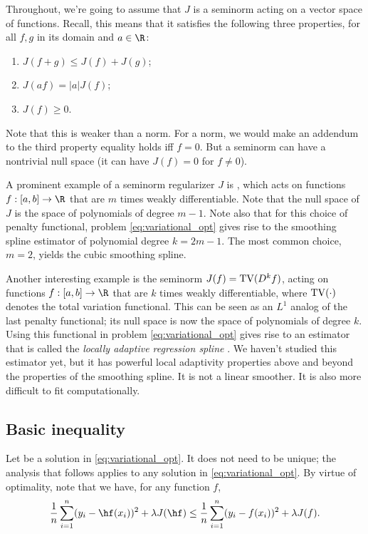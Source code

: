 \documentclass{article}
\begin{document}
Throughout, we're going to assume that $J$ is a seminorm acting on a vector
space of functions. Recall, this means that it satisfies the following three
properties, for all $f,g$ in its domain and $a \in \R$: 
\begin{enumerate}
\item $J(f+g) \leq J(f) + J(g)$;
\item $J(af) = |a| J(f)$;
\item $J(f) \geq 0$.
\end{enumerate}
Note that this is weaker than a norm. For a norm, we would make an addendum to
the third property equality holds iff $f=0$. But a seminorm can have a
nontrivial null space (it can have $J(f) = 0$ for $f \not= 0$).   

A prominent example of a seminorm regularizer $J$ is , which acts on functions $f: [a,b] \to \R$ that are $m$
times weakly differentiable. Note that the null space of $J$ is the space of
polynomials of degree $m-1$. Note also that for this choice of penalty
functional, problem \eqref{eq:variational_opt} gives rise to the smoothing
spline estimator of polynomial degree $k=2m-1$. The most common choice, $m=2$,
yields the cubic smoothing spline.   

Another interesting example is the seminorm $J(f) = \mathrm{TV}(D^k f)$, acting on
functions $f: [a,b] \to \R$ that are $k$ times weakly differentiable, where 
$\mathrm{TV}(\cdot)$ denotes the total variation functional. This can be seen as an
$L^1$ analog of the last penalty functional; its null space is now the space of
polynomials of degree $k$. Using this functional in problem
\eqref{eq:variational_opt} gives rise to an estimator that is called the
\emph{locally adaptive regression spline} \citep{mammen1997locally}. We haven't
studied this estimator yet, but it has powerful local adaptivity properties
above and beyond the properties of the smoothing spline. It is not a linear
smoother. It is also more difficult to fit computationally. 

\subsection{Basic inequality}

Let \smash{$\hf$} be a solution in \eqref{eq:variational_opt}. It does not need
to be unique; the analysis that follows applies to any solution in
\eqref{eq:variational_opt}. By virtue of optimality, note that we have, for any
function $f$,   
\begin{equation}
\label{eq:hf_better}
\frac{1}{n} \sum_{i=1}^n (y_i - \hf(x_i))^2 + \lambda J(\hf) \leq 
\frac{1}{n} \sum_{i=1}^n (y_i - f(x_i))^2 + \lambda J(f).
\end{equation}
\end{document}
